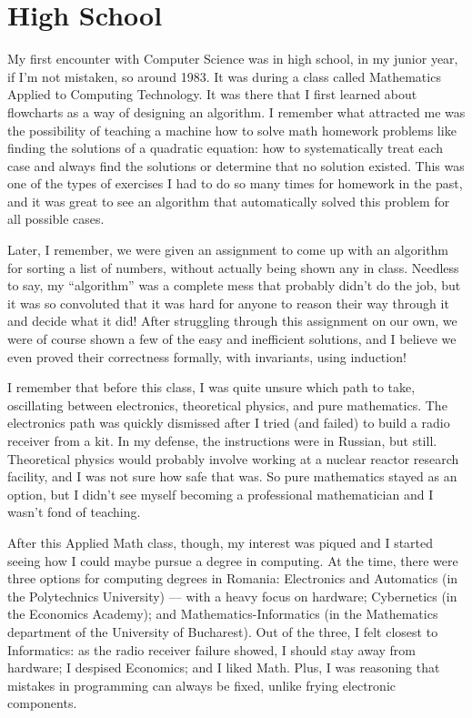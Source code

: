 \documentclass[12pt]{book}
\begin{document}
\section{High School}

My first encounter with Computer Science was in high school, in my
junior year, if I'm not mistaken, so around 1983. It was during a class
called Mathematics Applied to Computing Technology. It was there that I
first learned about flowcharts as a way of designing an algorithm. I
remember what attracted me was the possibility of teaching a machine how
to solve math homework problems like finding the solutions of a
quadratic equation: how to systematically treat each case and always
find the solutions or determine that no solution existed. This was one
of the types of exercises I had to do so many times for homework in the
past, and it was great to see an algorithm that automatically solved
this problem for all possible cases.

Later, I remember, we were given an assignment to come up with an
algorithm for sorting a list of numbers, without actually being shown
any in class. Needless to say, my ``algorithm'' was a complete mess that
probably didn't do the job, but it was so convoluted that it was hard
for anyone to reason their way through it and decide what it did! After
struggling through this assignment on our own, we were of course shown a
few of the easy and inefficient solutions, and I believe we even proved
their correctness formally, with invariants, using induction!

I remember that before this class, I was quite unsure which path to
take, oscillating between electronics, theoretical physics, and pure
mathematics. The electronics path was quickly dismissed after I tried
(and failed) to build a radio receiver from a kit. In my defense, the
instructions were in Russian, but still. Theoretical physics would
probably involve working at a nuclear reactor research facility, and I
was not sure how safe that was. So pure mathematics stayed as an option,
but I didn't see myself becoming a professional mathematician and I
wasn't fond of teaching.

After this Applied Math class, though, my interest was piqued and I
started seeing how I could maybe pursue a degree in computing. At the
time, there were three options for computing degrees in Romania:
Electronics and Automatics (in the Polytechnics University) --- with a
heavy focus on hardware; Cybernetics (in the Economics Academy); and
Mathematics-Informatics (in the Mathematics department of the University
of Bucharest). Out of the three, I felt closest to Informatics: as the
radio receiver failure showed, I should stay away from hardware; I
despised Economics; and I liked Math. Plus, I was reasoning that
mistakes in programming can always be fixed, unlike frying electronic
components.
\end{document}
